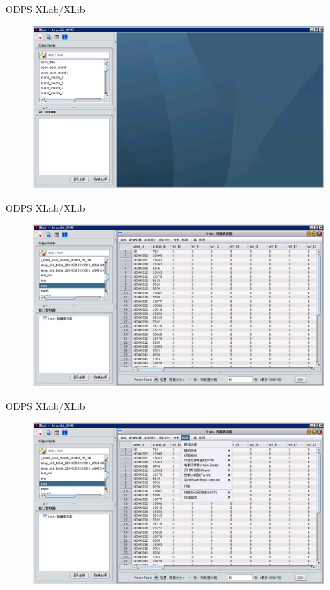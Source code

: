 \documentclass{beamer}
\begin{document}
\begin{frame}{ODPS XLab/XLib}

\begin{figure}
\includegraphics[width=\linewidth]{./XLab}
\end{figure}

\end{frame}

\begin{frame}{ODPS XLab/XLib}

\begin{figure}
\includegraphics[width=\linewidth]{./XLab_table}
\end{figure}

\end{frame}

\begin{frame}{ODPS XLab/XLib}

\begin{figure}
\includegraphics[width=\linewidth]{./XLab_models}
\end{figure}

\end{frame}
\end{document}
